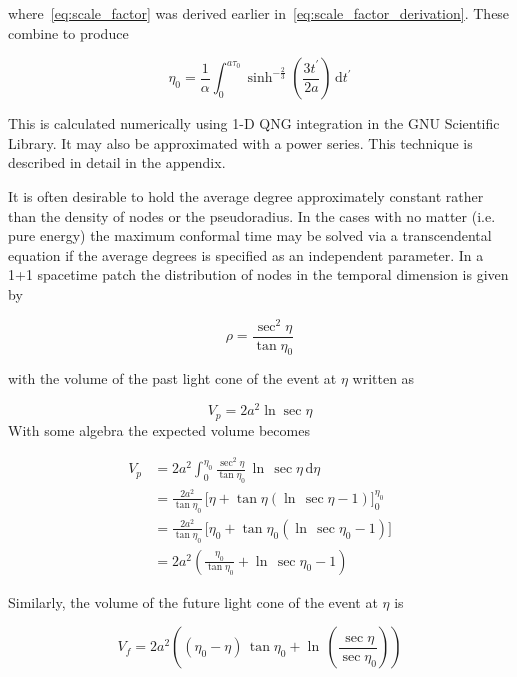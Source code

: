 \documentclass[preprint,notitlepage,amsmath,amssymb,floatfix]{revtex4-1}
\begin{document}
\noindent where~\eqref{eq:scale_factor} was derived earlier in~\eqref{eq:scale_factor_derivation}.
These combine to produce

\begin{equation}
\eta_0 = \frac{1}{\alpha}\int_0^{a\tau_0}\!\sinh^{-\frac{2}{3}}\left(\frac{3t^\prime}{2a}\right)\,\mathrm dt^\prime
\end{equation}

\noindent This is calculated numerically using 1-D QNG integration in the GNU Scientific Library.  It may also be approximated with a power series.  This technique is described in detail in the appendix. \par
It is often desirable to hold the average degree approximately constant rather than the density of nodes or the pseudoradius.  
In the cases with no matter (i.e. pure energy) the maximum conformal time may be solved via a transcendental equation if the average degrees is specified as an independent parameter.
In a 1+1 spacetime patch the distribution of nodes in the temporal dimension is given by

\begin{equation}
\rho = \frac{\sec^2\eta}{\tan\eta_0}
\end{equation}

\noindent with the volume of the past light cone of the event at $\eta$ written as

\begin{equation}
V_p = 2a^2\ln\sec\eta
\end{equation}
\noindent With some algebra the expected volume becomes

\begin{equation}
\begin{split}
V_p &= 2a^2\int_0^{\eta_0}\!\frac{\sec^2\eta}{\tan\eta_0}\,\ln\,\sec\eta\,\mathrm{d}\eta \\
  &= \frac{2a^2}{\tan\eta_0}\,\lbrack\eta + \tan\eta\left(\ln\,\sec\eta - 1\right)\rbrack_0^{\eta_0} \\
  &= \frac{2a^2}{\tan\eta_0}\,\lbrack\eta_0 + \tan\eta_0\left(\ln\,\sec\eta_0 - 1\right)\rbrack \\
  &= 2a^2\left(\frac{\eta_0}{\tan\eta_0} + \ln\,\sec\eta_0 - 1\right)
\end{split}
\end{equation}

\noindent Similarly, the volume of the future light cone of the event at $\eta$ is

\begin{equation}
V_f = 2a^2\left(\left(\eta_0 - \eta\right)\,\tan\eta_0 + \ln\,\left(\frac{\sec\eta}{\sec\eta_0}\right)\right)
\end{equation}
\end{document}
